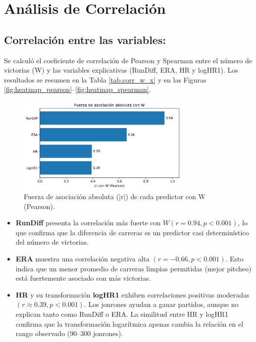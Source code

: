 \documentclass[10pt]{article}
\begin{document}
\section{Análisis de Correlación}
\subsection{Correlación entre las variables:}

Se calculó el coeficiente de correlación de Pearson y Spearman entre el número de victorias (W) y las variables explicativas 
(RunDiff, ERA, HR y logHR1). Los resultados se resumen en la Tabla \ref{tab:corr_w_x} y en las Figuras 
\ref{fig:heatmap_pearson}--\ref{fig:heatmap_spearman}.



\begin{figure}[H]
    \centering
    \includegraphics[width=0.75\textwidth]{../plots/bar_abs_r_W.png}
    \caption{Fuerza de asociación absoluta (|r|) de cada predictor con W (Pearson).}
    \label{fig:bar_abs_r}
\end{figure}

\begin{itemize}
    \item \textbf{RunDiff} presenta la correlación más fuerte con $W (r = 0.94, p < 0.001)$, lo que confirma que la diferencia de carreras es un predictor casi determinístico del número de victorias.
    \item \textbf{ERA} muestra una correlación negativa alta $(r = -0.66, p < 0.001)$. Esto indica que un menor promedio de carreras limpias permitidas (mejor pitcheo) está fuertemente asociado con más victorias.
    \item \textbf{HR} y su transformación \textbf{logHR1} exhiben correlaciones positivas moderadas $(r \approx 0.39, p < 0.001)$. Los jonrones ayudan a ganar partidos, aunque no explican tanto como RunDiff o ERA. La similitud entre HR y logHR1 confirma que la transformación logarítmica apenas cambia la relación en el rango observado (90--300 jonrones).
\end{itemize}
\end{document}

